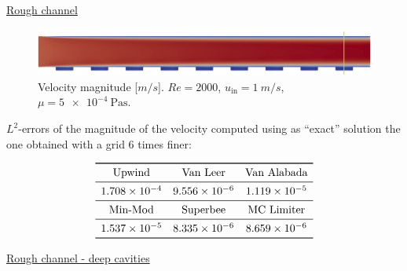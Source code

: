 \documentclass{beamer}
\begin{document}
\begin{frame}[label=rough]{\hyperlink{roughSupp}{Rough channel}}
\begin{figure}[t]
	\centering
	\includegraphics[width=\textwidth]{rough_channel_vl_barra.png}
	\caption{\tiny Velocity magnitude [$\si{m/s}$]. $Re=2000$, $u_\text{in} = 
	\SI{1}{m/s}$, $\mu=\SI{5e-4}{\pascal\second}$.}
\end{figure}
$L^2$-errors of the magnitude of the velocity computed using as ``exact'' 
solution the one obtained with a grid 6 times finer:
\begin{table}
	\footnotesize
	\centering
	\[
	\begin{array}{ccc}
	\toprule
	\text{Upwind} & \text{Van Leer} & \text{Van Alabada}\\
	\midrule
	\num{1.708e-4} & \num{9.556e-6} & \num{1.119e-5}\\
	\midrule
	\text{Min-Mod} & \text{Superbee} & \text{MC Limiter} \\ 
	\midrule
	\num{1.537e-5} & \num{8.335e-6} & \num{8.659e-6}\\
	\bottomrule
	\end{array}
	\]
\end{table}
\end{frame}
\begin{frame}{\hyperlink{roughSupp}{Rough channel - deep cavities}}
\begin{figure}
	\centering
	
\end{figure}
\end{frame}
\end{document}
